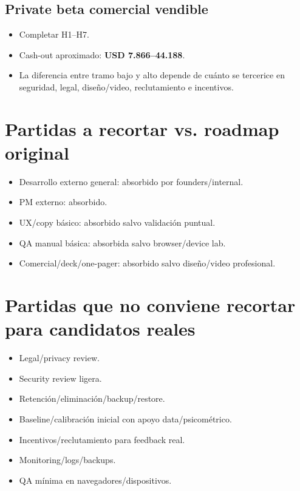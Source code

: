 \documentclass[11pt,a4paper]{article}
\begin{document}
\subsection{Private beta comercial vendible}
\begin{itemize}
  \item Completar H1--H7.
  \item Cash-out aproximado: \textbf{USD 7.866--44.188}.
  \item La diferencia entre tramo bajo y alto depende de cuánto se tercerice en seguridad, legal, diseño/video, reclutamiento e incentivos.
\end{itemize}

\section{Partidas a recortar vs. roadmap original}
\begin{itemize}
  \item Desarrollo externo general: absorbido por founders/internal.
  \item PM externo: absorbido.
  \item UX/copy básico: absorbido salvo validación puntual.
  \item QA manual básica: absorbida salvo browser/device lab.
  \item Comercial/deck/one-pager: absorbido salvo diseño/video profesional.
\end{itemize}

\section{Partidas que no conviene recortar para candidatos reales}
\begin{itemize}
  \item Legal/privacy review.
  \item Security review ligera.
  \item Retención/eliminación/backup/restore.
  \item Baseline/calibración inicial con apoyo data/psicométrico.
  \item Incentivos/reclutamiento para feedback real.
  \item Monitoring/logs/backups.
  \item QA mínima en navegadores/dispositivos.
\end{itemize}
\end{document}
